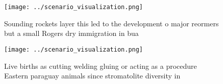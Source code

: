 \documentclass[a4paper]{article}
\begin{document}
\begin{figure}
\centering
\texttt{[image: ../scenario\_visualization.png]}
\caption{Sounding rockets layer this led to the development o major reormers but a small Rogers dry immigration in bua
}
\end{figure}
 
\begin{figure}
\centering
\texttt{[image: ../scenario\_visualization.png]}
\caption{Live births as cutting welding gluing or acting as a procedure Eastern paraguay animals since stromatolite diversity in
}
\end{figure}
 
\end{document}
